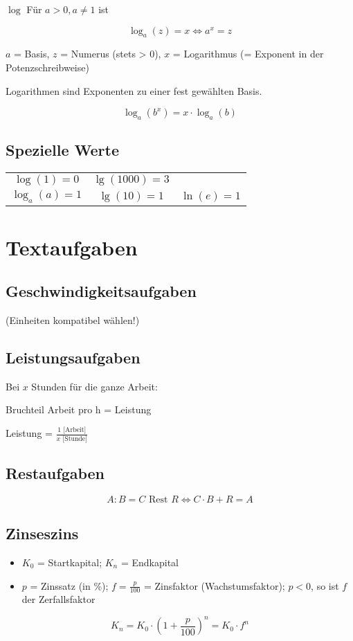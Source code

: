 \begin{multicols}{2}
\begin{definition}{$\log$}{}
Für $a>0, a\ne 1$ ist

$$\log_a{}(z)=x \Longleftrightarrow{} a^x = z$$
\end{definition}
$a$ = Basis, $z$ = Numerus (stets > 0), $x$ = Logarithmus (= Exponent in der Potenzschreibweise)

Logarithmen sind Exponenten zu einer fest gewählten Basis.

\begin{gesetz}{}{}
$$\log_a(b^x) = x\cdot{}\log_a(b)$$
\end{gesetz}

\subsection{Spezielle Werte}
\begin{tabular}{ccc}
$\log(1)=0$     &    $\lg(1000)=3$           &\\
$\log_a(a) = 1$ & $\lg(10) = 1$ & $\ln(e) = 1$\\
\end{tabular} 

\newpage

\section{Textaufgaben}

\subsection{Geschwindigkeitsaufgaben}
 (Einheiten kompatibel wählen!)

\subsection{Leistungsaufgaben}
Bei $x$ Stunden für die ganze Arbeit:

Bruchteil Arbeit pro h = Leistung

Leistung = $\frac{1 \textrm{ [Arbeit]}}{x \textrm{ [Stunde]}}$

\subsection{Restaufgaben}
$$A:B = C \textrm{ Rest } R \Longleftrightarrow{}  C\cdot{}B+R = A$$

\subsection{Zinseszins}
\begin{itemize}
\item $K_0$ = Startkapital; $K_n$ = Endkapital
\item $p$ = Zinssatz (in \%); $f = \frac{p}{100}$ = Zinsfaktor
(Wachstumsfaktor); $p<0$, so ist $f$ der Zerfallsfaktor
\end{itemize}
$$K_n = K_0 \cdot{} \left( 1+\frac{p}{100} \right)^n = K_0\cdot{}f^n$$


\end{multicols}
